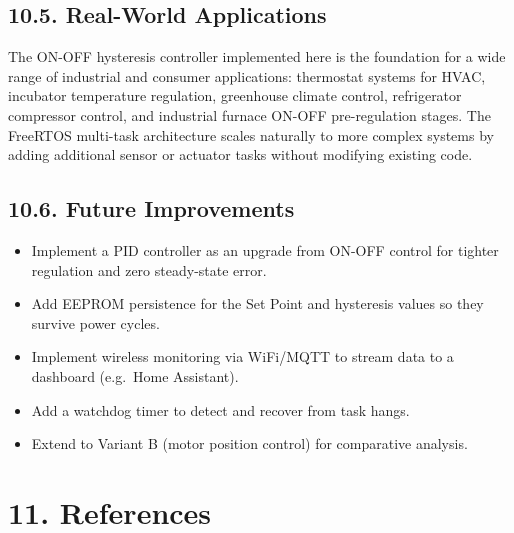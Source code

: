 \documentclass[12pt]{article}
\begin{document}
\subsection*{10.5. Real-World Applications}

The ON-OFF hysteresis controller implemented here is the foundation for a wide
range of industrial and consumer applications: thermostat systems for HVAC,
incubator temperature regulation, greenhouse climate control, refrigerator
compressor control, and industrial furnace ON-OFF pre-regulation stages. The
FreeRTOS multi-task architecture scales naturally to more complex systems by
adding additional sensor or actuator tasks without modifying existing code.

\subsection*{10.6. Future Improvements}

\begin{itemize}
    \item Implement a PID controller as an upgrade from ON-OFF control for
          tighter regulation and zero steady-state error.
    \item Add EEPROM persistence for the Set Point and hysteresis values so
          they survive power cycles.
    \item Implement wireless monitoring via WiFi/MQTT to stream data to a
          dashboard (e.g.\ Home Assistant).
    \item Add a watchdog timer to detect and recover from task hangs.
    \item Extend to Variant B (motor position control) for comparative analysis.
\end{itemize}

\section*{11. References}
\end{document}
